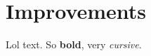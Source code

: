 \documentclass[Main]{subfiles}
\begin{document}
\section{Improvements} %
	\label{sec:improvements}

	Lol text.
	So \textbf{bold}, very \emph{cursive}.

\end{document}
